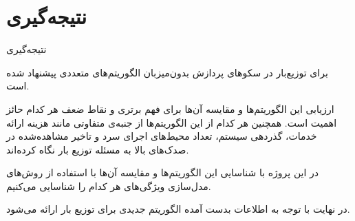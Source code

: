 \section{نتیجه‌گیری}

\begin{frame}{نتیجه‌گیری}
	\begin{itemize}\RTList
{} برای توزیع‌بار در سکو‌های پردازش بدون‌میزبان الگوریتم‌های متعددی پیشنهاد شده است.

 ارزیابی این الگوریتم‌ها و مقایسه آن‌ها برای فهم برتری و نقاط ضعف هر کدام حائز اهمیت است.
همچنین هر کدام از این الگوریتم‌ها از جنبه‌ی متفاوتی مانند هزینه ارائه خدمات، گذردهی سیستم،
تعداد محیط‌های اجرای سرد و تاخیر مشاهده‌شده در صدک‌های بالا به مسئله توزیع بار نگاه کرده‌اند.

 در این پروژه با شناسایی این الگوریتم‌ها و مقایسه آن‌ها با استفاده از روش‌های مدل‌سازی ویژگی‌های
هر کدام را شناسایی می‌کنیم.

 در نهایت با توجه به اطلاعات بدست آمده الگوریتم جدیدی برای توزیع بار ارائه می‌شود.
	\end{itemize}
\end{frame}